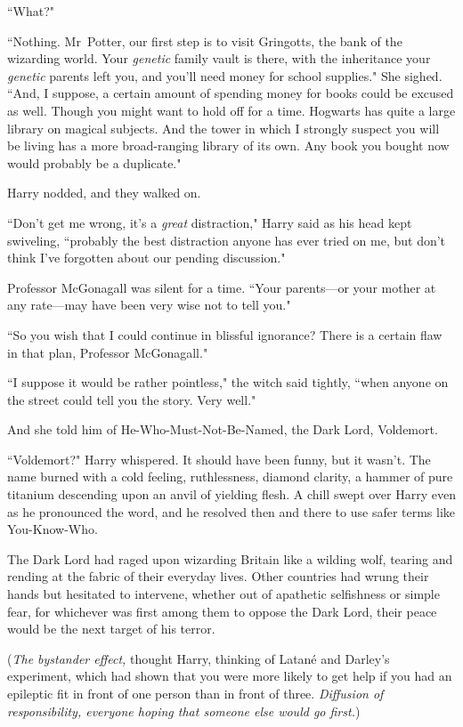 ``What?"

``Nothing. Mr~Potter, our first step is to visit Gringotts, the bank of the wizarding world. Your \emph{genetic} family vault is there, with the inheritance your \emph{genetic} parents left you, and you'll need money for school supplies." She sighed. ``And, I suppose, a certain amount of spending money for books could be excused as well. Though you might want to hold off for a time. Hogwarts has quite a large library on magical subjects. And the tower in which I strongly suspect you will be living has a more broad-ranging library of its own. Any book you bought now would probably be a duplicate."

Harry nodded, and they walked on.

``Don't get me wrong, it's a \emph{great} distraction," Harry said as his head kept swiveling, ``probably the best distraction anyone has ever tried on me, but don't think I've forgotten about our pending discussion."

Professor McGonagall was silent for a time. ``Your parents---or your mother at any rate---may have been very wise not to tell you."

``So you wish that I could continue in blissful ignorance? There is a certain flaw in that plan, Professor McGonagall."

``I suppose it would be rather pointless," the witch said tightly, ``when anyone on the street could tell you the story. Very well."

And she told him of He-Who-Must-Not-Be-Named, the Dark Lord, Voldemort.

``Voldemort?" Harry whispered. It should have been funny, but it wasn't. The name burned with a cold feeling, ruthlessness, diamond clarity, a hammer of pure titanium descending upon an anvil of yielding flesh. A chill swept over Harry even as he pronounced the word, and he resolved then and there to use safer terms like You-Know-Who.

The Dark Lord had raged upon wizarding Britain like a wilding wolf, tearing and rending at the fabric of their everyday lives. Other countries had wrung their hands but hesitated to intervene, whether out of apathetic selfishness or simple fear, for whichever was first among them to oppose the Dark Lord, their peace would be the next target of his terror.

(\emph{The bystander effect,} thought Harry, thinking of Latané and Darley's experiment, which had shown that you were more likely to get help if you had an epileptic fit in front of one person than in front of three. \emph{Diffusion of responsibility, everyone hoping that someone else would go first.})

